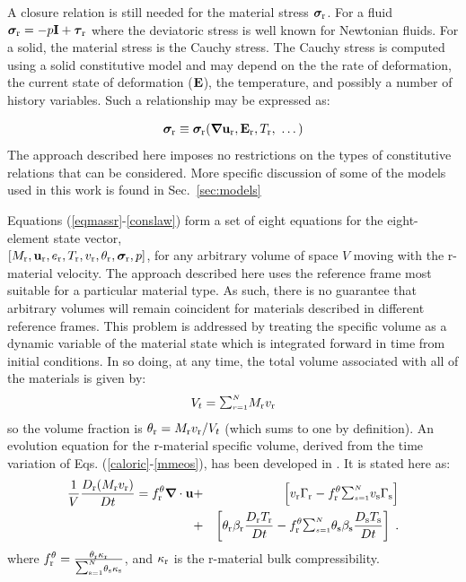 A closure relation is still needed for the material stress $\mbox{\boldmath $\sigma \!\!$ \unboldmath}_{\rm r}$.  For a fluid $\mbox{\boldmath $\sigma \!\!$ \unboldmath}_{\rm r} = -p{\bf I} + \mbox{\boldmath $\tau \!\!$ \unboldmath}_{\rm r}$ where the deviatoric stress is well known for Newtonian fluids.  For a solid, the material stress is the Cauchy stress.  The Cauchy stress is computed using a solid constitutive model and may depend on the the rate of deformation, the current state of deformation (${\bf E}$), the temperature, and possibly a number of history variables.  Such a relationship may be expressed as:

%
\begin{equation}
{\mbox{\boldmath $\sigma \!\!$ \unboldmath}}_{\rm r} \equiv \mbox{\boldmath $\sigma \!\!$ \unboldmath}_{\rm r}(\mbox{\boldmath $\nabla \!\!$ \unboldmath}{\bf u}_{\rm r}, {\bf E}_{\rm r}, T_{\rm r},~ \dots)
\label{conslaw}
\end{equation}
%
The approach described here imposes no restrictions on the types of constitutive relations that can be considered.  More specific discussion of some of the models used in this work is found in Sec.~\ref{sec:models}

Equations (\ref{eqmassr}-\ref{conslaw}) form a set of eight equations for the eight-element state vector, \\ $[M_{\rm r}, {\bf u}_{\rm r}, e_{\rm r}, T_{\rm r}, v_{\rm r}, \theta_{\rm r}, \mbox{\boldmath $\sigma \!\!$ \unboldmath}_{\rm r}, p]$, for any arbitrary volume of space $V$ moving with the r-material velocity.  The approach described here uses the reference frame most suitable for a particular material type.  As such, there is no guarantee that arbitrary volumes will remain coincident for materials described in different reference frames.  This problem is addressed by treating the specific volume as a dynamic variable of the material state which is integrated forward in time from initial conditions.  In so doing, at any time, the total volume associated with all of the materials is given by:
%
\begin{eqnarray}
V_t = {\raise1.5pt\hbox{$\scriptstyle\sum_{r=1}^N$}} M_\rmr v_\rmr
\end{eqnarray}
%
so the volume fraction is $\theta_{\rm r} = M_{\rm r} v_{\rm r} / V_t$ (which sums to one by definition).  An evolution equation for the r-material specific volume, derived from the time variation of Eqs. (\ref{caloric}-\ref{mmeos}), has been developed in \cite{kashiwa2000}.  It is stated here as:
%
\begin{eqnarray}
{1\over V}{D_\rmr (M_\rmr v_\rmr) \over Dt} =
f_\rmr^{\theta} \bnabla \cdot \bfu &+&
\left[v_\rmr \Gamma_\rmr -
f_\rmr^{\theta} \SUM
v_\rms \Gamma_\rms \right]  \nonumber \\ &+&
\left[\theta_\rmr
\beta_\rmr {D_\rmr T_\rmr\over Dt} -
f_\rmr^{\theta} \SUM
\theta_\rms \beta_\rms {D_\rms T_\rms\over Dt} \right] \; .
\label{eqspvolr}
\end{eqnarray}
%
where $f_\rmr^{\theta} = {{\theta_\rmr \kappa_\rmr} \over {\raise1pt\hbox{${\scriptstyle\sum_{\rms =1}^N}$}} \theta_\rms\kappa_\rms}$, and $\kappa_{\rm r}$ is the r-material bulk compressibility.


